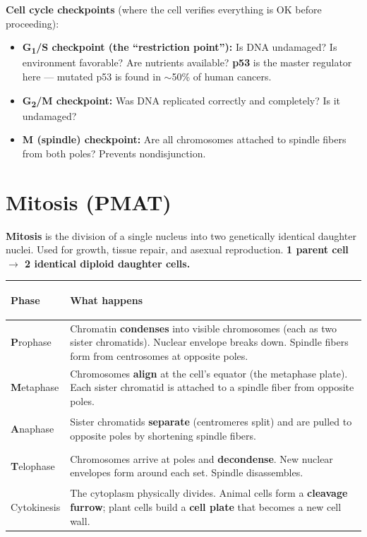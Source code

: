 \documentclass[11pt, letterpaper]{article}
\begin{document}
\textbf{Cell cycle checkpoints} (where the cell verifies everything is OK before proceeding):
\begin{itemize}[noitemsep]
  \item \textbf{G\textsubscript{1}/S checkpoint (the ``restriction point''):} Is DNA undamaged? Is environment favorable? Are nutrients available? \textbf{p53} is the master regulator here --- mutated p53 is found in $\sim$50\% of human cancers.
  \item \textbf{G\textsubscript{2}/M checkpoint:} Was DNA replicated correctly and completely? Is it undamaged?
  \item \textbf{M (spindle) checkpoint:} Are all chromosomes attached to spindle fibers from both poles? Prevents nondisjunction.
\end{itemize}

\section*{Mitosis (PMAT)}

\textbf{Mitosis} is the division of a single nucleus into two genetically identical
daughter nuclei. Used for growth, tissue repair, and asexual reproduction. \textbf{1 parent
cell $\to$ 2 identical diploid daughter cells.}

\noindent
{\renewcommand{\arraystretch}{1.6}
\begin{tabularx}{\textwidth}{>{\bfseries\raggedright\arraybackslash}p{2.5cm}
                              >{\raggedright\arraybackslash}X}
\toprule
\rowcolor{tableheaderteal}
\textbf{Phase} & \textbf{What happens} \\
\midrule
\rowcolor{rowTe} \textbf{P}rophase & Chromatin \textbf{condenses} into visible chromosomes (each as two sister chromatids). Nuclear envelope breaks down. Spindle fibers form from centrosomes at opposite poles. \\
\rowcolor{rowA}  \textbf{M}etaphase & Chromosomes \textbf{align} at the cell's equator (the metaphase plate). Each sister chromatid is attached to a spindle fiber from opposite poles. \\
\rowcolor{rowTe} \textbf{A}naphase & Sister chromatids \textbf{separate} (centromeres split) and are pulled to opposite poles by shortening spindle fibers. \\
\rowcolor{rowA}  \textbf{T}elophase & Chromosomes arrive at poles and \textbf{decondense}. New nuclear envelopes form around each set. Spindle disassembles. \\
\rowcolor{rowTe} Cytokinesis      & The cytoplasm physically divides. Animal cells form a \textbf{cleavage furrow}; plant cells build a \textbf{cell plate} that becomes a new cell wall. \\
\bottomrule
\end{tabularx}}
\end{document}
